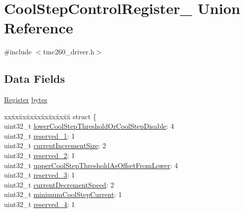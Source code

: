 \hypertarget{union_cool_step_control_register__}{}\section{Cool\+Step\+Control\+Register\+\_\+ Union Reference}
\label{union_cool_step_control_register__}


{\ttfamily \#include $<$tmc260\+\_\+driver.\+h$>$}

\subsection*{Data Fields}
\begin{DoxyCompactItemize}
\item 
\mbox{\hyperlink{tmc260__driver_8h_a280b01a3b5bb4294fcee278b00c030d6}{Register}} \mbox{\hyperlink{union_cool_step_control_register___a445b72174063a88455cd86c22d77d03f}{bytes}}
\item 
\begin{tabbing}
xx\=xx\=xx\=xx\=xx\=xx\=xx\=xx\=xx\=\kill
struct \{\\
\>uint32\_t \mbox{\hyperlink{union_cool_step_control_register___a9a642405b33c7c5871acdc91b76e022a}{lowerCoolStepThresholdOrCoolStepDisable}}: 4\\
\>uint32\_t \mbox{\hyperlink{union_cool_step_control_register___aa5d9ea4624bf97017a821a70177c6bdb}{reserved\_1}}: 1\\
\>uint32\_t \mbox{\hyperlink{union_cool_step_control_register___a22bf9a9bfb112875af92a16079771f8b}{currentIncrementSize}}: 2\\
\>uint32\_t \mbox{\hyperlink{union_cool_step_control_register___a50b223df92282d04dfa46306b53a9905}{reserved\_2}}: 1\\
\>uint32\_t \mbox{\hyperlink{union_cool_step_control_register___a84ae4a5a201e30da398f39e1a409ee76}{upperCoolStepThresholdAsOffsetFromLower}}: 4\\
\>uint32\_t \mbox{\hyperlink{union_cool_step_control_register___af8407645db2d0329264f3c6d0cbd6dd1}{reserved\_3}}: 1\\
\>uint32\_t \mbox{\hyperlink{union_cool_step_control_register___a6f2d5c619fb9b48315f8a4de1c2e5931}{currentDecrementSpeed}}: 2\\
\>uint32\_t \mbox{\hyperlink{union_cool_step_control_register___af8688794d33927fc968f85c08d9762fa}{minimumCoolStepCurrent}}: 1\\
\>uint32\_t \mbox{\hyperlink{union_cool_step_control_register___aaf2eb7a7615ec891d7e5a9d49d433f37}{reserved\_4}}: 1\\

\end{tabbing}
\end{DoxyCompactItemize}
